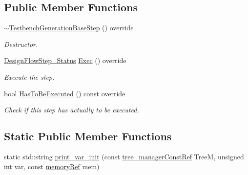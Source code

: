 \subsection*{Public Member Functions}
\begin{DoxyCompactItemize}
\item 
\hyperlink{classTestbenchGenerationBaseStep_a474ad98fb32935847aa4050e3aa8f979}{$\sim$\+Testbench\+Generation\+Base\+Step} () override
\begin{DoxyCompactList}\small\item\em Destructor. \end{DoxyCompactList}\item 
\hyperlink{design__flow__step_8hpp_afb1f0d73069c26076b8d31dbc8ebecdf}{Design\+Flow\+Step\+\_\+\+Status} \hyperlink{classTestbenchGenerationBaseStep_a81cdc7a419f3795b97b205cc8ac28e97}{Exec} () override
\begin{DoxyCompactList}\small\item\em Execute the step. \end{DoxyCompactList}\item 
bool \hyperlink{classTestbenchGenerationBaseStep_a22c9fdb0a26c1947958a749ba2fa9a17}{Has\+To\+Be\+Executed} () const override
\begin{DoxyCompactList}\small\item\em Check if this step has actually to be executed. \end{DoxyCompactList}\end{DoxyCompactItemize}
\subsection*{Static Public Member Functions}
\begin{DoxyCompactItemize}
\item 
static std\+::string \hyperlink{classTestbenchGenerationBaseStep_a65bdf2b170262882a4f5f3b07a0c9ed8}{print\+\_\+var\+\_\+init} (const \hyperlink{tree__manager_8hpp_a792e3f1f892d7d997a8d8a4a12e39346}{tree\+\_\+manager\+Const\+Ref} TreeM, unsigned int var, const \hyperlink{memory_8hpp_aec1333ec6cd561731fb3ed3e55b9caf5}{memory\+Ref} mem)
\end{DoxyCompactItemize}
